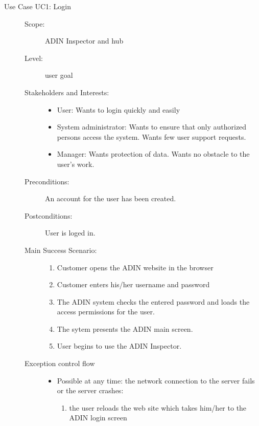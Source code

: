 \documentclass[twoside, english, final]{Pflichtenheft}
\begin{document}
\begin{description}
	\item[Use Case UC1: Login]
	      \hfill
	      \begin{description}
		      \item[Scope:] ADIN Inspector and hub
		      \item[Level:] user goal
		      \item[Stakeholders and Interests:]
		            \hfill
		            \begin{itemize}
			            \item{User: Wants to login quickly and easily}
			            \item{System administrator: Wants to ensure that only authorized persons access the system. Wants few user support requests.}
			            \item{Manager: Wants protection of data. Wants no obstacle to the user's work.}
		            \end{itemize}
		      \item[Preconditions:] An account for the user has been created.
		      \item[Postconditions:] User is loged in.
		      \item[Main Success Scenario:]
		            \hfill
		            \begin{enumerate}
			            \item{Customer opens the ADIN website in the browser}
			            \item{Customer enters his/her username and password}
			            \item{The ADIN system checks the entered password and loads the access permissions for the user.}
			            \item{The sytem presents the ADIN main screen.}
			            \item{User begins to use the ADIN Inspector.}
		            \end{enumerate}

		      \item[Exception control flow]
		            \hfill
		            \begin{itemize}
			            \item[] Possible at any time: the network connection to the server fails or the server crashes:
			                  \begin{enumerate}
				                  \item{the user reloads the web site which takes him/her to the ADIN login screen}
			                  \end{enumerate}


\end{itemize}
\end{description}
\end{description}
\end{document}
